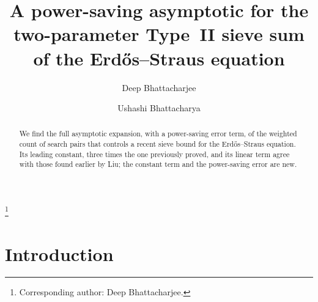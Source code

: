 \documentclass{amsart}
\theoremstyle{definition}
\theoremstyle{remark}
\numberwithin{equation}{section}
\begin{document}
\title[The Type~II sieve sum for the Erd\H{o}s--Straus equation]{A power-saving asymptotic for the two-parameter Type~II sieve sum of the Erd\H{o}s--Straus equation}

\author[D. Bhattacharjee]{Deep Bhattacharjee}
\address{Formerly, Electro-Gravitational Space Propulsion Laboratory (EGSPL),\newline Bhubaneswar, Odisha 751030, India; Formerly, University of Calcutta, Senate House,/1 College Street, Kolkata 700073, West Bengal, India}
\thanks{Corresponding author: Deep Bhattacharjee.}

\author[U. Bhattacharya]{Ushashi Bhattacharya}
\address{Formerly, National Taiwan University, Taipei 106319, Taiwan}


\begin{abstract}
We find the full asymptotic expansion, with a power-saving error term, of the weighted count of search pairs that controls a recent sieve bound for the Erd\H{o}s--Straus equation. Its leading constant, three times the one previously proved, and its linear term agree with those found earlier by Liu; the constant term and the power-saving error are new.
\end{abstract}

\maketitle

\setcounter{tocdepth}{1}
\tableofcontents

\section{Introduction}
\enlargethispage{3pt}
\end{document}
